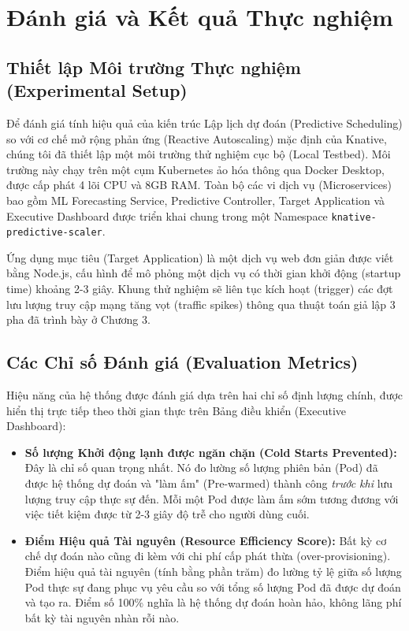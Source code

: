 \section{Đánh giá và Kết quả Thực nghiệm}

\subsection{Thiết lập Môi trường Thực nghiệm (Experimental Setup)}
Để đánh giá tính hiệu quả của kiến trúc Lập lịch dự đoán (Predictive Scheduling) so với cơ chế mở rộng phản ứng (Reactive Autoscaling) mặc định của Knative, chúng tôi đã thiết lập một môi trường thử nghiệm cục bộ (Local Testbed). Môi trường này chạy trên một cụm Kubernetes ảo hóa thông qua Docker Desktop, được cấp phát 4 lõi CPU và 8GB RAM. Toàn bộ các vi dịch vụ (Microservices) bao gồm ML Forecasting Service, Predictive Controller, Target Application và Executive Dashboard được triển khai chung trong một Namespace \texttt{knative-predictive-scaler}.

Ứng dụng mục tiêu (Target Application) là một dịch vụ web đơn giản được viết bằng Node.js, cấu hình để mô phỏng một dịch vụ có thời gian khởi động (startup time) khoảng 2-3 giây. Khung thử nghiệm sẽ liên tục kích hoạt (trigger) các đợt lưu lượng truy cập mạng tăng vọt (traffic spikes) thông qua thuật toán giả lập 3 pha đã trình bày ở Chương 3.

\subsection{Các Chỉ số Đánh giá (Evaluation Metrics)}
Hiệu năng của hệ thống được đánh giá dựa trên hai chỉ số định lượng chính, được hiển thị trực tiếp theo thời gian thực trên Bảng điều khiển (Executive Dashboard):
\begin{itemize}
    \item \textbf{Số lượng Khởi động lạnh được ngăn chặn (Cold Starts Prevented):} Đây là chỉ số quan trọng nhất. Nó đo lường số lượng phiên bản (Pod) đã được hệ thống dự đoán và "làm ấm" (Pre-warmed) thành công \textit{trước khi} lưu lượng truy cập thực sự đến. Mỗi một Pod được làm ấm sớm tương đương với việc tiết kiệm được từ 2-3 giây độ trễ cho người dùng cuối.
    \item \textbf{Điểm Hiệu quả Tài nguyên (Resource Efficiency Score):} Bất kỳ cơ chế dự đoán nào cũng đi kèm với chi phí cấp phát thừa (over-provisioning). Điểm hiệu quả tài nguyên (tính bằng phần trăm) đo lường tỷ lệ giữa số lượng Pod thực sự đang phục vụ yêu cầu so với tổng số lượng Pod đã được dự đoán và tạo ra. Điểm số 100\% nghĩa là hệ thống dự đoán hoàn hảo, không lãng phí bất kỳ tài nguyên nhàn rỗi nào.
\end{itemize}

